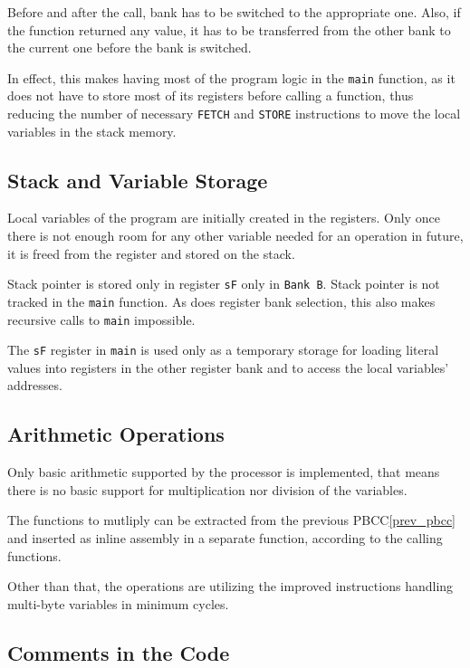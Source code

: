         Before and after the call, bank has to be switched to the appropriate one. Also, if the function returned any value, it has to be transferred from the other bank to the current one before the bank is switched.

        In effect, this makes having most of the program logic in the \texttt{main} function, as it does not have to store most of its registers before calling a function, thus reducing the number of necessary \texttt{FETCH} and \texttt{STORE} instructions to move the local variables in the stack memory.

        \subsection{Stack and Variable Storage}

        Local variables of the program are initially created in the registers. Only once there is not enough room for any other variable needed for an operation in future, it is freed from the register and stored on the stack.

        Stack pointer is stored only in register \texttt{sF} only in \texttt{Bank B}. Stack pointer is not tracked in the \texttt{main} function. As does register bank selection, this also makes recursive calls to \texttt{main} impossible.

        The \texttt{sF} register in \texttt{main} is used only as a temporary storage for loading literal values into registers in the other register bank and to access the local variables' addresses.

        \subsection{Arithmetic Operations}

        Only basic arithmetic supported by the processor is implemented, that means there is no basic support for multiplication nor division of the variables.

        The functions to mutliply can be extracted from the previous PBCC\ref{prev_pbcc} and inserted as inline assembly in a separate function, according to the calling functions.

        Other than that, the operations are utilizing the improved instructions handling multi-byte variables in minimum cycles.

        \subsection{Comments in the Code}

